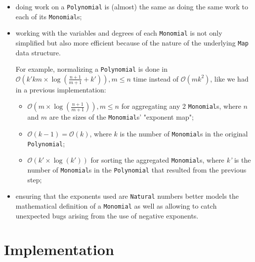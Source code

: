\documentclass[11pt,a4paper]{article}
\begin{document}
\begin{itemize}
    \item doing work on a \lstinline{Polynomial} is (almost) the same as doing the same work to each of its \lstinline{Monomial}s;

    \item working with the variables and degrees of each \lstinline{Monomial} is not only simplified but also more efficient because of the nature of the underlying \lstinline{Map} data structure.

          For example, normalizing a \lstinline{Polynomial} is done in $ \mathcal{O} \left( k' k m \times \log \left( \frac{n+1}{m+1} + k' \right) \right), m \leq n $ time instead of $ \mathcal{O} \left( m k^2 \right) $, like we had in a previous implementation:
          \begin{itemize}
              \item $ \mathcal{O} \left( m \times \log \left( \frac{n+1}{m+1} \right) \right), m \leq n $ for aggregating any 2 \lstinline{Monomial}s, where $n$ and $m$ are the sizes of the \lstinline{Monomial}s' "exponent map";

              \item $ \mathcal{O} (k-1) = \mathcal{O} (k) $, where $k$ is the number of \lstinline{Monomial}s in the original \lstinline{Polynomial};

              \item $ \mathcal{O} (k' \times \log(k')) $ for sorting the aggregated \lstinline{Monomial}s, where \textit{k'} is the number of \lstinline{Monomial}s in the \lstinline{Polynomial} that resulted from the previous step;
          \end{itemize}

    \item ensuring that the exponents used are \lstinline{Natural} numbers better models the mathematical definition of a \lstinline{Monomial} as well as allowing to catch unexpected bugs arising from the use of negative exponents.

\end{itemize}

\section{Implementation}
\end{document}
